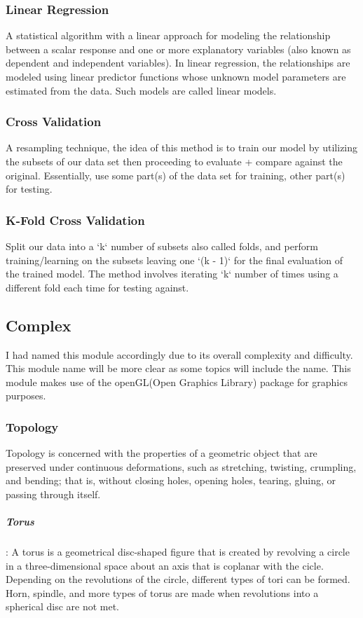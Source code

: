 \documentclass[12pt, letterpaper]{article}
\begin{document}
\begin{sloppypar}
\begin{flushleft}
\subsubsection{Linear Regression}
A statistical algorithm with a linear approach for modeling the relationship between a 
scalar response and one or more explanatory variables (also known as dependent and 
independent variables). In linear regression, the relationships are modeled using linear 
predictor functions whose unknown model parameters are estimated from the data. Such models 
are called linear models.

\subsubsection{Cross Validation}
A resampling technique, the idea of this method is to train our model by utilizing 
the subsets of our data set then proceeding to evaluate + compare against the original.
Essentially, use some part(s) of the data set for training, other part(s) for testing.

\subsubsection{K-Fold Cross Validation}
Split our data into a `k` number of subsets also called folds, and perform
training/learning on the subsets leaving one `(k - 1)` for the final evaluation of 
the trained model. The method involves iterating `k` number of times using a different
fold each time for testing against.

\subsection{Complex}
I had named this module accordingly due to its overall complexity and difficulty. This module
name will be more clear as some topics will include the name. This module makes use of the 
openGL(Open Graphics Library) package for graphics purposes. 

\subsubsection{Topology}
Topology is concerned with the properties of a geometric object that are preserved under
continuous deformations, such as stretching, twisting, crumpling, and bending; that is,
without closing holes, opening holes, tearing, gluing, or passing through itself.

\subparagraph*{Torus}: A torus is a geometrical disc-shaped figure that is created by
revolving a circle in a three-dimensional space about an axis that is coplanar with the 
cicle. Depending on the revolutions of the circle, different types of tori can be formed. 
Horn, spindle, and more types of torus are made when revolutions into a spherical disc 
are not met.


\end{flushleft}
\end{sloppypar}
\end{document}
